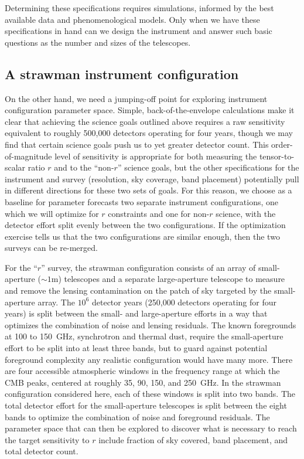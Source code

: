 Determining these specifications requires simulations, informed by the best available data and phenomenological models.  Only when we have these specifications in hand can we design the instrument and answer such basic questions as the number and sizes of the telescopes. 

\subsection{A strawman instrument configuration}

On the other hand, we need a jumping-off point for exploring instrument configuration parameter space. Simple, back-of-the-envelope calculations make it clear that achieving the science goals outlined above requires a raw sensitivity equivalent to roughly 500,000 detectors operating for four years, though we may find that certain science goals push us to yet greater detector count. This order-of-magnitude level of sensitivity is appropriate for both measuring the tensor-to-scalar ratio $r$ and to the ``non-$r$'' science goals, but the other specifications for the instrument and survey (resolution, sky coverage, band placement) potentially pull in different directions for these two sets of goals. For this reason, we choose as a baseline for parameter forecasts two separate instrument configurations, one which we will optimize for $r$ constraints and one for non-$r$ science, with the detector effort split evenly between the two configurations. If the optimization exercise tells us that the two configurations are similar enough, then the two surveys can be re-merged. 

For the ``$r$'' survey, the strawman configuration consists of an array of small-aperture ($\sim 1$m) telescopes and a separate large-aperture telescope to measure and remove the lensing contamination on the patch of sky targeted by the small-aperture array. The $10^6$ detector years (250,000 detectors operating for four years) is split between the small- and large-aperture efforts in a way that optimizes the combination of noise and lensing residuals. The known foregrounds at 100 to 150~GHz, synchrotron and thermal dust, require the small-aperture effort to be split into at least three bands, but to guard against potential foreground complexity any realistic configuration would have many more. There are four accessible atmospheric windows in the frequency range at which the CMB peaks, centered at roughly 35, 90, 150, and 250~GHz. In the strawman configuration considered here, each of these windows is split into two bands. The total detector effort for the small-aperture telescopes is split between the eight bands to optimize the combination of noise and foreground residuals. The parameter space that can then be explored to discover what is necessary to reach the target sensitivity to $r$ include fraction of sky covered, band placement, and total detector count.

